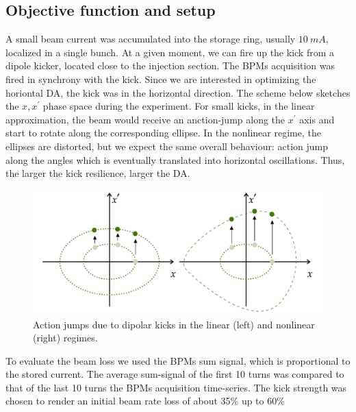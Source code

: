 \subsection{Objective function and setup}
A small beam current was accumulated into the storage ring, usually $10~\unit{mA}$, localized in a single bunch. At a given moment, we can fire up the kick from a dipole kicker, located close to the injection section. The BPMs acquisition was fired in synchrony with the kick. Since we are interested in optimizing the horiontal DA, the kick was in the horizontal direction. The scheme below sketches the $x,x^\prime$ phase space during the experiment. For small kicks, in the linear approximation, the beam would receive an anction-jump along the $x^\prime$ axis and start to rotate along the corresponding ellipse. In the nonlinear regime, the ellipses are distorted, but we expect the same overall behaviour: action jump along the angles which is eventually translated into horizontal oscillations. Thus, the larger the kick resilience, larger the DA.
\begin{figure}
    \centering
    \includegraphics[width=\textwidth]{Images/phase_space_kick.pdf}
    \caption[Action jumps due to dipolar kicks in the linear and nonlinear regimes.]{Action jumps due to dipolar kicks in the linear (left) and nonlinear (right) regimes.}
\end{figure}
To evaluate the beam loss we used the BPMs sum signal, which is proportional to the stored current. The average sum-signal of the first 10 turns was compared to that of the last 10 turns the BPMs acquisition time-series. The kick strength was chosen to render an initial beam rate loss of about 35\% up to 60\%
